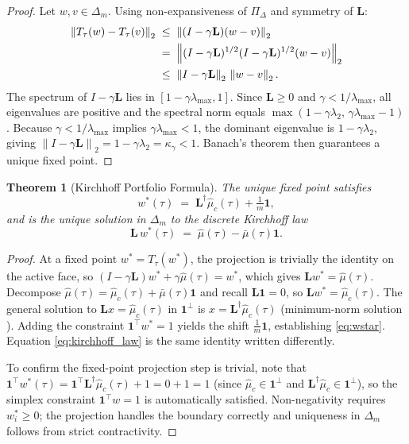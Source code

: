 \documentclass[twocolumn,11pt,a4paper]{article}
\theoremstyle{plain}
\newtheorem{theorem}{Theorem}[section]
\theoremstyle{definition}
\theoremstyle{remark}
\newcommand{\Lop}{\mathbf{L}}        %
\newcommand{\Lpinv}{\mathbf{L}^{\dagger}} %
\newcommand{\proj}{\Pi_{\Delta}}     %
\newcommand{\wstar}{w^{*}}
\newcommand{\Deltam}{\Delta_m}
\newcommand{\lamtwo}{\lambda_2}
\newcommand{\lammax}{\lambda_{\max}}
\newcommand{\norm}[1]{\left\|#1\right\|}
\newcommand{\one}{\mathbf{1}}
\begin{document}
\begin{proof}
  Let $w,v\in\Deltam$.  Using non-expansiveness of $\proj$ and
  symmetry of $\Lop$:
  \begin{align}
    \norm{T_\tau(w)-T_\tau(v)}_2
    &\;\le\; \norm{(I-\gamma\Lop)(w-v)}_2 \notag\\
    &\;=\;   \norm{(I-\gamma\Lop)^{1/2}(I-\gamma\Lop)^{1/2}(w-v)}_2 \notag\\
    &\;\le\; \norm{I-\gamma\Lop}_2\,\norm{w-v}_2.
    \label{eq:contraction_step}
  \end{align}
  The spectrum of $I-\gamma\Lop$ lies in $[1-\gamma\lammax,1]$.  Since
  $\Lop\ge 0$ and $\gamma<1/\lammax$, all eigenvalues are positive and
  the spectral norm equals $\max(1-\gamma\lamtwo,\,\gamma\lammax-1)$.
  Because $\gamma<1/\lammax$ implies $\gamma\lammax<1$, the dominant
  eigenvalue is $1-\gamma\lamtwo$, giving
  $\norm{I-\gamma\Lop}_2=1-\gamma\lamtwo=\kappa_\gamma<1$.  Banach's
  theorem \cite{Banach1922} then guarantees a unique fixed point.
\end{proof}

\begin{theorem}[Kirchhoff Portfolio Formula]
  \label{thm:kirchhoff}
  The unique fixed point satisfies
  \begin{equation}
    \wstar(\tau) \;=\; \Lpinv\hat\mu_c(\tau) + \tfrac{1}{m}\one,
    \label{eq:wstar}
  \end{equation}
  and is the unique solution in $\Deltam$ to the discrete Kirchhoff
  law
  \begin{equation}
    \Lop\,\wstar(\tau) \;=\; \hat\mu(\tau) - \bar\mu(\tau)\one.
    \label{eq:kirchhoff_law}
  \end{equation}
\end{theorem}

\begin{proof}
  At a fixed point $w^*=T_\tau(w^*)$, the projection is trivially
  the identity on the active face, so
  $(I-\gamma\Lop)w^*+\gamma\hat\mu(\tau)=w^*$, which gives
  $\Lop w^*=\hat\mu(\tau)$.  Decompose $\hat\mu(\tau)=\hat\mu_c(\tau)+\bar\mu(\tau)\one$
  and recall $\Lop\one=0$, so $\Lop w^*=\hat\mu_c(\tau)$.  The general
  solution to $\Lop x=\hat\mu_c(\tau)$ in $\one^{\perp}$ is
  $x=\Lpinv\hat\mu_c(\tau)$ (minimum-norm solution \cite{Penrose1955}).
  Adding the constraint $\one^{\top}w^*=1$ yields the shift
  $\frac{1}{m}\one$, establishing \eqref{eq:wstar}.  Equation
  \eqref{eq:kirchhoff_law} is the same identity written differently.

  To confirm the fixed-point projection step is trivial, note that
  $\one^{\top}\wstar(\tau)=\one^{\top}\Lpinv\hat\mu_c(\tau)+1=0+1=1$
  (since $\hat\mu_c\in\one^{\perp}$ and $\Lpinv\hat\mu_c\in\one^{\perp}$),
  so the simplex constraint $\one^{\top}w=1$ is automatically
  satisfied.  Non-negativity requires $w^*_i\ge 0$; the projection
  handles the boundary correctly and uniqueness in $\Deltam$ follows
  from strict contractivity.
\end{proof}
\end{document}
